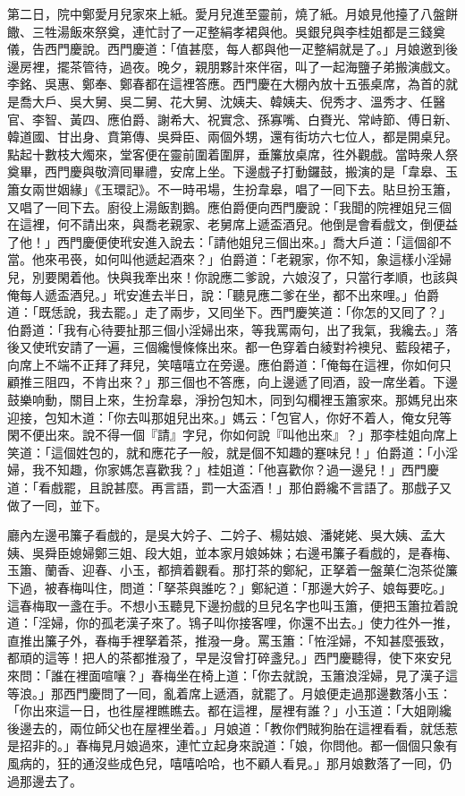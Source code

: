 第二日，院中鄭愛月兒家來上紙。愛月兒進至靈前，燒了紙。月娘見他擡了八盤餅饊、三牲湯飯來祭奠，連忙討了一疋整絹孝裙與他。{}吳銀兒與李桂姐都是三錢奠儀，告西門慶說。西門慶道：「值甚麼，每人都與他一疋整絹就是了。」月娘邀到後邊房裡，擺茶管待，過夜。晚夕，親朋夥計來伴宿，叫了一起海鹽子弟搬演戲文。李銘、吳惠、鄭奉、鄭春都在這裡答應。西門慶在大棚內放十五張桌席，為首的就是喬大戶、吳大舅、吳二舅、花大舅、沈姨夫、韓姨夫、倪秀才、溫秀才、任醫官、李智、黃四、應伯爵、謝希大、祝實念、孫寡嘴、白賚光、常峙節、傅日新、韓道國、甘出身、賁第傳、吳舜臣、兩個外甥，還有街坊六七位人，都是開桌兒。點起十數枝大燭來，堂客便在靈前圍着圍屏，垂簾放桌席，徃外觀戲。當時衆人祭奠畢，西門慶與敬濟囘畢禮，安席上坐。下邊戲子打動鑼鼓，搬演的是「韋皋、玉簫女兩世姻緣」《玉環記》。不一時弔場，生扮韋皋，唱了一囘下去。貼旦扮玉簫，又唱了一囘下去。廚役上湯飯割鵝。應伯爵便向西門慶說：「我聞的院裡姐兒三個在這裡，何不請出來，與喬老親家、老舅席上遞盃酒兒。他倒是會看戲文，倒便益了他！」西門慶便使玳安進入說去：「請他姐兒三個出來。」喬大戶道：「這個卻不當。他來弔䘮，如何叫他遞起酒來？」{}伯爵道：「老親家，你不知，象這樣小淫婦兒，別要閑着他。快與我牽出來！你說應二爹說，六娘沒了，只當行孝順，也該與俺每人遞盃酒兒。」{}玳安進去半日，說：「聽見應二爹在坐，都不出來哩。」伯爵道：「既恁說，我去罷。」走了兩步，又囘坐下。西門慶笑道：「你怎的又囘了？」伯爵道：「我有心待要扯那三個小淫婦出來，等我罵兩句，出了我氣，我纔去。」落後又使玳安請了一遍，三個纔慢條條出來。都一色穿着白綾對衿襖兒、藍段裙子，向席上不端不正拜了拜兒，笑嘻嘻立在旁邊。應伯爵道：「俺每在這裡，你如何只顧推三阻四，不肯出來？」那三個也不答應，向上邊遞了囘酒，設一席坐着。下邊鼓樂响動，關目上來，生扮韋皋，淨扮包知木，同到勾欄裡玉簫家來。那媽兒出來迎接，包知木道：「你去叫那姐兒出來。」媽云：「包官人，你好不着人，俺女兒等閑不便出來。說不得一個『請』字兒，你如何說『叫他出來』？」那李桂姐向席上笑道：「這個姓包的，就和應花子一般，就是個不知趣的蹇味兒！」伯爵道：「小淫婦，我不知趣，你家媽怎喜歡我？」桂姐道：「他喜歡你？過一邊兒！」西門慶道：「看戲罷，且說甚麼。再言語，罰一大盃酒！」那伯爵纔不言語了。那戲子又做了一囘，並下。

廳內左邊弔簾子看戲的，是吳大妗子、二妗子、楊姑娘、潘姥姥、吳大姨、孟大姨、吳舜臣媳婦鄭三姐、段大姐，並本家月娘姊妹；右邊弔簾子看戲的，是春梅、玉簫、蘭香、迎春、小玉，都擠着觀看。那打茶的鄭紀，正拏着一盤菓仁泡茶從簾下過，被春梅叫住，問道：「拏茶與誰吃？」鄭紀道：「那邊大妗子、娘每要吃。」這春梅取一盞在手。不想小玉聽見下邊扮戲的旦兒名字也叫玉簫，便把玉簫拉着說道：「淫婦，你的孤老漢子來了。鴇子叫你接客哩，你還不出去。」{}使力徃外一推，直推出簾子外，春梅手裡拏着茶，推潑一身。罵玉簫：「恠淫婦，不知甚麼張致，都頑的這等！把人的茶都推潑了，早是沒曾打碎盞兒。」西門慶聽得，使下來安兒來問：「誰在裡面喧嚷？」春梅坐在椅上道：「你去就說，玉簫浪淫婦，見了漢子這等浪。」那西門慶問了一囘，亂着席上遞酒，就罷了。月娘便走過那邊數落小玉：「你出來這一日，也徃屋裡瞧瞧去。都在這裡，屋裡有誰？」小玉道：「大姐剛纔後邊去的，兩位師父也在屋裡坐着。」月娘道：「教你們賊狗胎在這裡看看，就恁惹是招非的。」春梅見月娘過來，連忙立起身來說道：「娘，你問他。都一個個只象有風病的，狂的通沒些成色兒，嘻嘻哈哈，也不顧人看見。」那月娘數落了一囘，仍過那邊去了。

